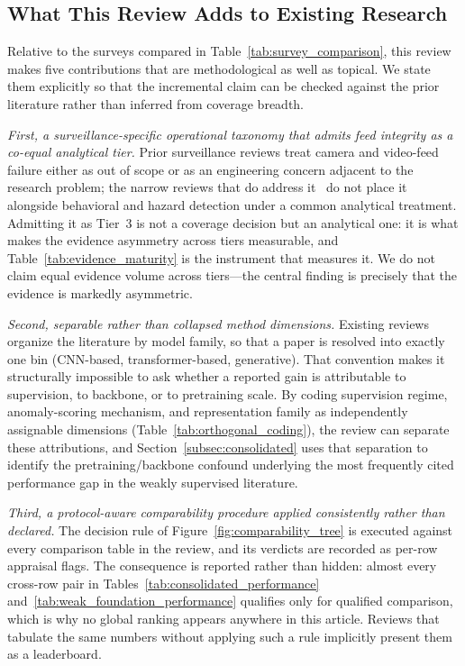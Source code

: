 \documentclass[10pt,a4paper]{article}
\begin{document}
\subsection{What This Review Adds to Existing Research}
\label{subsec:what_this_adds}

Relative to the surveys compared in Table~\ref{tab:survey_comparison}, this review makes five contributions that are methodological as well as topical. We state them explicitly so that the incremental claim can be checked against the prior literature rather than inferred from coverage breadth.

\emph{First, a surveillance-specific operational taxonomy that admits feed integrity as a co-equal analytical tier.} Prior surveillance reviews treat camera and video-feed failure either as out of scope or as an engineering concern adjacent to the research problem; the narrow reviews that do address it~\citep{mantini2023feature_survey} do not place it alongside behavioral and hazard detection under a common analytical treatment. Admitting it as Tier~3 is not a coverage decision but an analytical one: it is what makes the evidence asymmetry across tiers measurable, and Table~\ref{tab:evidence_maturity} is the instrument that measures it. We do not claim equal evidence volume across tiers---the central finding is precisely that the evidence is markedly asymmetric.

\emph{Second, separable rather than collapsed method dimensions.} Existing reviews organize the literature by model family, so that a paper is resolved into exactly one bin (CNN-based, transformer-based, generative). That convention makes it structurally impossible to ask whether a reported gain is attributable to supervision, to backbone, or to pretraining scale. By coding supervision regime, anomaly-scoring mechanism, and representation family as independently assignable dimensions (Table~\ref{tab:orthogonal_coding}), the review can separate these attributions, and Section~\ref{subsec:consolidated} uses that separation to identify the pretraining/backbone confound underlying the most frequently cited performance gap in the weakly supervised literature.

\emph{Third, a protocol-aware comparability procedure applied consistently rather than declared.} The decision rule of Figure~\ref{fig:comparability_tree} is executed against every comparison table in the review, and its verdicts are recorded as per-row appraisal flags. The consequence is reported rather than hidden: almost every cross-row pair in Tables~\ref{tab:consolidated_performance} and~\ref{tab:weak_foundation_performance} qualifies only for qualified comparison, which is why no global ranking appears anywhere in this article. Reviews that tabulate the same numbers without applying such a rule implicitly present them as a leaderboard.
\end{document}
